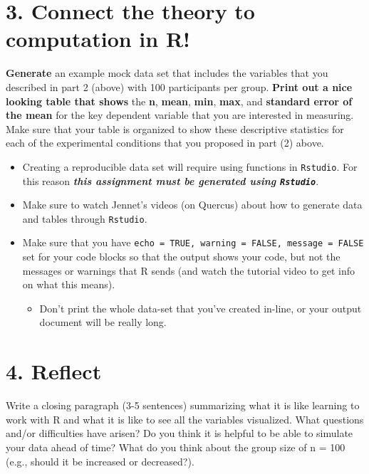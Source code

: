 \documentclass[
]{book}
\providecommand{\tightlist}{%
  \setlength{\itemsep}{0pt}\setlength{\parskip}{0pt}}
\begin{document}
\section*{3. Connect the theory to computation in R!}\label{connect-the-theory-to-computation-in-r}

\textbf{Generate} an example mock data set that includes the variables that you described in part 2 (above) with 100 participants per group. \textbf{Print out a nice looking table that shows} the \textbf{n}, \textbf{mean}, \textbf{min}, \textbf{max}, and \textbf{standard error of the mean} for the key dependent variable that you are interested in measuring. Make sure that your table is organized to show these descriptive statistics for each of the experimental conditions that you proposed in part (2) above.

\begin{itemize}
\item
  Creating a reproducible data set will require using functions in \texttt{Rstudio}. For this reason \textbf{\emph{this assignment must be generated using \texttt{Rstudio}}}.
\item
  Make sure to watch Jennet's videos (on Quercus) about how to generate data and tables through \texttt{Rstudio}.
\item
  Make sure that you have \texttt{echo\ =\ TRUE,\ warning\ =\ FALSE,\ message\ =\ FALSE} set for your code blocks so that the output shows your code, but not the messages or warnings that R sends (and watch the tutorial video to get info on what this means).

  \begin{itemize}
  \tightlist
  \item
    Don't print the whole data-set that you've created in-line, or your output document will be really long.
  \end{itemize}
\end{itemize}

\section*{4. Reflect}\label{reflect-2}

Write a closing paragraph (3-5 sentences) summarizing what it is like learning to work with R and what it is like to see all the variables visualized. What questions and/or difficulties have arisen? Do you think it is helpful to be able to simulate your data ahead of time? What do you think about the group size of n = 100 (e.g., should it be increased or decreased?).
\end{document}
